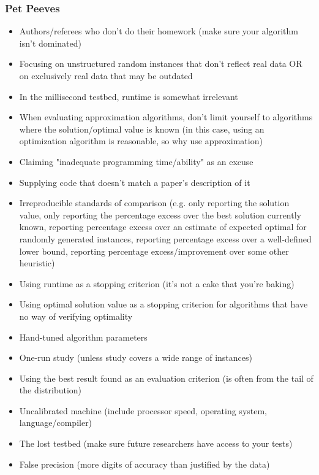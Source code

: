 \subsubsection{Pet Peeves}

\begin{itemize}
    \item Authors/referees who don't do their homework (make sure your algorithm isn't dominated)
    \item Focusing on unstructured random instances that don't reflect real data OR on exclusively real data that may be outdated
    \item In the millisecond testbed, runtime is somewhat irrelevant
    \item When evaluating approximation algorithms, don't limit yourself to algorithms where the solution/optimal value is known (in this case, using an optimization algorithm is reasonable, so why use approximation)
    \item Claiming "inadequate programming time/ability" as an excuse
    \item Supplying code that doesn't match a paper's description of it
    \item Irreproducible standards of comparison (e.g. only reporting the solution value, only reporting the percentage excess over the best solution currently known, reporting percentage excess over an estimate of expected optimal for randomly generated instances, reporting percentage excess over a well-defined lower bound, reporting percentage excess/improvement over some other heuristic)
    \item Using runtime as a stopping criterion (it's not a cake that you're baking)
    \item Using optimal solution value as a stopping criterion for algorithms that have no way of verifying optimality
    \item Hand-tuned algorithm parameters
    \item One-run study (unless study covers a wide range of instances)
    \item Using the best result found as an evaluation criterion (is often from the tail of the distribution)
    \item Uncalibrated machine (include processor speed, operating system, language/compiler)
    \item The lost testbed (make sure future researchers have access to your tests)
    \item False precision (more digits of accuracy than justified by the data)

\end{itemize}
